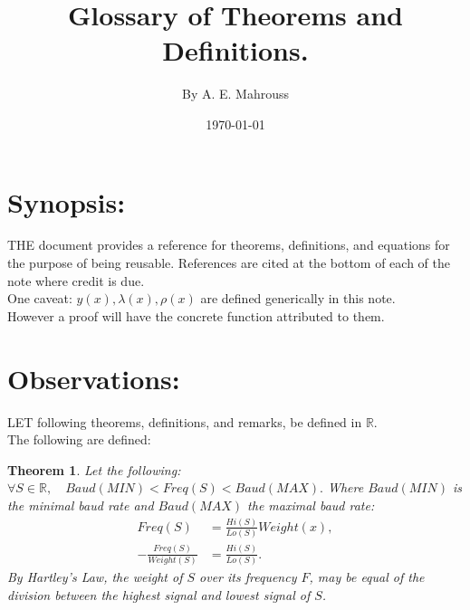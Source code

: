 \documentclass[10pt]{article}
\title{%
	\vspace{-1.5em}%
	\large\textbf{Glossary of Theorems and Definitions.}%
}
\author{By A. E. Mahrouss}
\date{\today}
\theoremstyle{plain}
\newtheorem{theorem}{Theorem}[section]
\theoremstyle{definition}
\theoremstyle{remark}
\begin{document}

\maketitle
\tableofcontents
\newpage

\section{Synopsis:}

\lettrine[lines=2, lhang=0.1, loversize=0.2]{T}HE document provides a reference for theorems, definitions, and equations for the purpose of being reusable. References are cited at the bottom of each of the note where credit is due.\\
One caveat: $y(x), \lambda(x), \rho(x)$ are defined generically in this note.\\However a proof will have the concrete function attributed to them.

\section{Observations:}

\lettrine[lines=1, lhang=0.1, loversize=0.2]{L}ET following theorems, definitions, and remarks, be defined in $\mathbb{R}.$\\The following are defined:

\begin{theorem}
Let the following:
$\forall S \in \mathbb{R}, \quad Baud(MIN) < Freq(S) < Baud(MAX).$ Where $Baud(MIN)$ is the minimal baud rate and $Baud(MAX)$ the maximal baud rate:
\begin{align*}
	Freq(S) &= \frac{Hi(S)}{Lo(S)} Weight(x),\\
	-\frac{Freq(S)}{Weight(S)} &= \frac{Hi(S)}{Lo(S)}.
\end{align*}
By Hartley's Law, the weight of $S$ over its frequency $F$, may be equal of the division between the highest signal and lowest signal of $S$.
\end{theorem}
\end{document}
